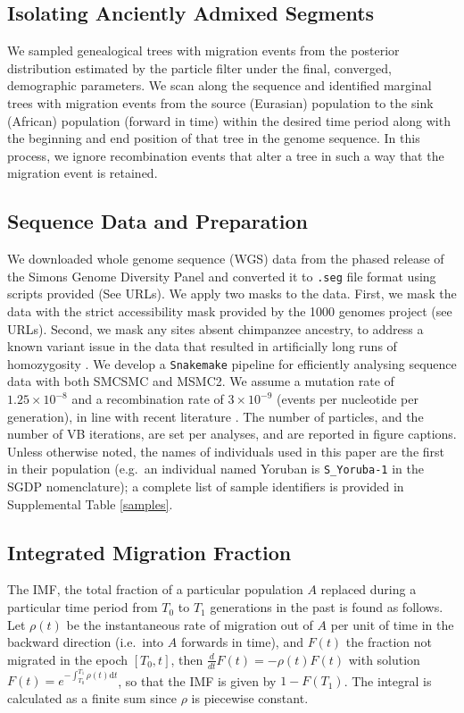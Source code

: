 \subsection{Isolating Anciently Admixed Segments} We sampled genealogical trees with migration events from the posterior distribution estimated by the particle filter under the final, converged, demographic parameters. We scan along the sequence and identified marginal trees with migration events from the source (Eurasian) population to the sink (African) population (forward in time) within the desired time period along with the beginning and end position of that tree in the genome sequence. In this process, we ignore recombination events that alter a tree in such a way that the migration event is retained.  

\subsection{Sequence Data and Preparation}  We downloaded whole genome sequence (WGS) data from the phased release of the Simons Genome Diversity Panel and converted it to {\tt .seg} file format using scripts provided (See URLs). We apply two masks to the data. First, we mask the data with the strict accessibility mask provided by the 1000 genomes project (see URLs). Second, we mask any sites absent chimpanzee ancestry, to address a known variant issue in the data that resulted in artificially long runs of homozygosity \cite{Wang2019a}. We develop a {\tt Snakemake} \cite{Koster2012} pipeline for efficiently analysing sequence data with both SMCSMC and MSMC2. We assume a mutation rate of $1.25\times10^{-8}$ and a recombination rate of $3\times10^{-9}$ (events per nucleotide per generation), in line with recent literature \cite{Scally2012, Schiffels2014a}. The number of particles, and the number of VB iterations, are set per analyses, and are reported in figure captions. Unless otherwise noted, the names of individuals used in this paper are the first in their population (e.g.\ an individual named Yoruban is {\tt S\_Yoruba-1} in the SGDP nomenclature); a complete list of sample identifiers is provided in Supplemental Table \ref{samples}. 



\subsection{Integrated Migration Fraction}
The IMF, the total fraction of a particular population $A$ replaced during a particular time period from $T_0$ to $T_1$ generations in the past is found as follows. Let $\rho(t)$ be the instantaneous rate of migration out of $A$ per unit of time in the backward direction (i.e.\ into $A$ forwards in time), and $F(t)$ the fraction not migrated in the epoch $[T_0,t]$, then $\frac{d}{dt} F(t) = -\rho(t) F(t)$ with solution $F(t) = e^{- \int_{T_0}^{T_1} \rho(t) {\mathrm{d}t}}$, so that the IMF is given by $1-F(T_1)$.  The integral is calculated as a finite sum since $\rho$ is piecewise constant.




